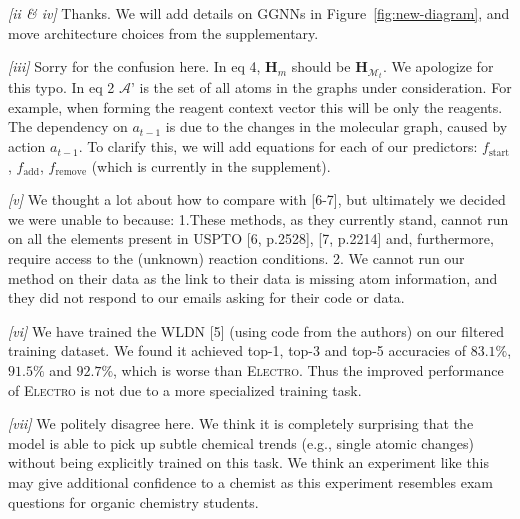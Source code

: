 \documentclass{article}
\newcommand{\ourModel}{\textsc{Electro}\xspace}
\begin{document}
\emph{[ii \& iv]}
Thanks. We will add details on GGNNs in Figure~\ref{fig:new-diagram}, and move architecture choices from the supplementary.

\emph{[iii]} 
Sorry for the confusion here. In eq 4, $\mathbf{H}_m$ should be $\mathbf{H}_{\mathcal{M}_t}$. We apologize for this typo.
In eq 2 $\mathcal{A}’$ is the set of all atoms in the graphs under consideration. For example, when forming the reagent context vector this will be only the reagents.
The dependency on $a_{t-1}$ is due to the changes in the molecular graph, caused by action $a_{t-1}$. 
To clarify this, we will add equations for each of our predictors: $f_\textrm{start}$, $f_\textrm{add}$, $f_\textrm{remove}$ (which is currently in the supplement).

\emph{[v]} 
We thought a lot about how to compare with [6-7], but
 ultimately we decided we were unable to because:
  1.These methods, as they currently stand, cannot run on all the elements present in USPTO [6, p.2528], [7, p.2214] and, furthermore, require access to the (unknown) reaction conditions. 
 2. We cannot run our method on their data as the link to their data is missing atom information, and they did not respond to our emails asking for their code or data. 

\emph{[vi]} We have trained the WLDN [5] (using code from the authors) on our filtered training dataset.
 We found it achieved top-1, top-3 and top-5 accuracies of $83.1\%$, $91.5\%$ and $92.7\%$, which is worse than \ourModel. 
 Thus the improved performance of \ourModel is not due to a more specialized training task.
  
\emph{[vii]}
 We politely disagree here.
  We think it is completely surprising that the model is able to pick up subtle chemical trends (e.g., single atomic changes) without being explicitly trained on this task.
   We think an experiment like this may give additional confidence to a chemist %
   as this experiment resembles exam questions for organic chemistry students. %
 
\end{document}
